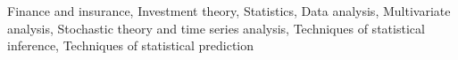 \documentclass[]{article}
\begin{document}
Finance and insurance, Investment theory, Statistics, Data analysis, Multivariate analysis, Stochastic theory and time series analysis, Techniques of statistical inference, Techniques of statistical prediction
\end{document}
